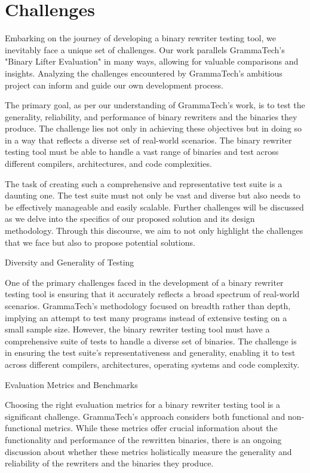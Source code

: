 \documentclass[a4paper,11pt,oneside]{report}
\begin{document}
\chapter{Challenges}

\setlength{\parindent}{4em}

\indent{}Embarking on the journey of developing a binary rewriter testing tool, we inevitably
face a unique set of challenges. Our work parallels GrammaTech's "Binary Lifter Evaluation"
in many ways, allowing for valuable comparisons and insights. Analyzing the challenges
encountered by GrammaTech's ambitious project can inform and guide our own
development process.

The primary goal, as per our understanding of GrammaTech's work, is to test the
generality, reliability, and performance of binary rewriters and the binaries they produce.
The challenge lies not only in achieving these objectives but in doing so in a way that reflects
a diverse set of real-world scenarios. The binary rewriter testing tool must be able to handle
a vast range of binaries and test across different compilers, architectures, and code
complexities.

The task of creating such a comprehensive and representative test suite is a daunting
one. The test suite must not only be vast and diverse but also needs to be effectively
manageable and easily scalable. Further challenges will be discussed as we delve into the
specifics of our proposed solution and its design methodology. Through this discourse, we
aim to not only highlight the challenges that we face but also to propose potential solutions.

Diversity and Generality of Testing

One of the primary challenges faced in the development of a binary rewriter testing
tool is ensuring that it accurately reflects a broad spectrum of real-world scenarios.
GrammaTech's methodology focused on breadth rather than depth, implying an attempt to
test many programs instead of extensive testing on a small sample size. However, the binary
rewriter testing tool must have a comprehensive suite of tests to handle a diverse set of
binaries. The challenge is in ensuring the test suite's representativeness and generality,
enabling it to test across different compilers, architectures, operating systems and code
complexity.

Evaluation Metrics and Benchmarks

Choosing the right evaluation metrics for a binary rewriter testing tool is a significant
challenge. GrammaTech's approach considers both functional and non-functional metrics.
While these metrics offer crucial information about the functionality and performance of
the rewritten binaries, there is an ongoing discussion about whether these metrics
holistically measure the generality and reliability of the rewriters and the binaries they
produce.
\end{document}
